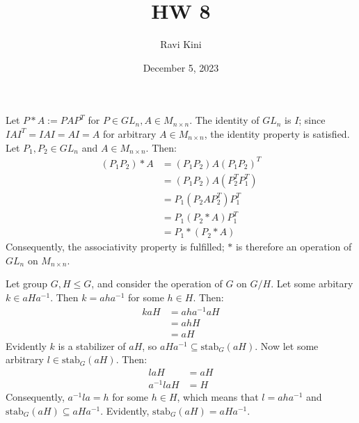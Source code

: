 \documentclass{article}
\title{HW 8}
\author{Ravi Kini}
\date{December 5, 2023}
\begin{document}
\maketitle

Let $P * A := PAP^T$ for $P \in GL_n, A \in M_{n\times n}$. The identity of $GL_n$ is $I$; since $IAI^T = IAI = AI = A$ for arbitrary $A \in M_{n \times n}$, the identity property is satisfied. Let $P_1, P_2 \in GL_n$ and $A \in M_{n \times n}$. Then:
\begin{equation}
    \begin{split}
        \left(P_1P_2\right) * A & = \left(P_1P_2\right)A\left(P_1P_2\right)^T \\
        & = \left(P_1P_2\right)A\left(P_2^TP_1^T\right) \\
        & = P_1\left(P_2AP_2^T\right)P_1^T \\
        & = P_1\left(P_2 * A\right)P_1^T \\
        & = P_1 * \left(P_2 * A\right)
    \end{split}
\end{equation}
Consequently, the associativity property is fulfilled; $*$ is therefore an operation of $GL_n$ on $M_{n \times n}$. 

\newpage

Let group $G, H \leq G$, and consider the operation of $G$ on $G/H$. Let some arbitary $k \in aHa^{-1}$. Then $k = aha^{-1}$ for some $h \in H$. Then:
\begin{equation}
    \begin{split}
        kaH & = aha^{-1}aH \\
        & = ahH \\
        & = aH
    \end{split}
\end{equation}
Evidently $k$ is a stabilizer of $aH$, so $aHa^{-1} \subseteq \mathrm{stab}_G\left(aH\right)$. Now let some arbitrary $l \in \mathrm{stab}_G\left(aH\right)$. Then:
\begin{equation}
    \begin{split}
        laH & = aH \\
        a^{-1}laH & = H
    \end{split}
\end{equation}
Consequently, $a^{-1}la = h$ for some $h \in H$, which means that $l = aha^{-1}$ and $\mathrm{stab}_G\left(aH\right) \subseteq aHa^{-1}$. Evidently, $\mathrm{stab}_G\left(aH\right) = aHa^{-1}$.
\end{document}
